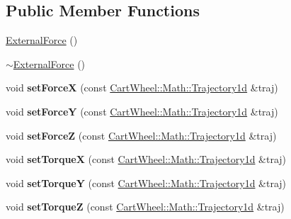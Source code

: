 \subsection*{Public Member Functions}
\begin{DoxyCompactItemize}
\item 
\hyperlink{classCartWheel_1_1Core_1_1ExternalForce_adad77fb363ad116e25f437e50814a629}{ExternalForce} ()
\item 
\hyperlink{classCartWheel_1_1Core_1_1ExternalForce_aebf14a4be55915ed564429a359a2b9d1}{$\sim$ExternalForce} ()
\item 
\hypertarget{classCartWheel_1_1Core_1_1ExternalForce_a99c1301919cb54b2657816791297f555}{
void {\bfseries setForceX} (const \hyperlink{classCartWheel_1_1Math_1_1GenericTrajectory}{CartWheel::Math::Trajectory1d} \&traj)}
\label{classCartWheel_1_1Core_1_1ExternalForce_a99c1301919cb54b2657816791297f555}

\item 
\hypertarget{classCartWheel_1_1Core_1_1ExternalForce_a2558648ac0b4e4d222b98fbcd281674e}{
void {\bfseries setForceY} (const \hyperlink{classCartWheel_1_1Math_1_1GenericTrajectory}{CartWheel::Math::Trajectory1d} \&traj)}
\label{classCartWheel_1_1Core_1_1ExternalForce_a2558648ac0b4e4d222b98fbcd281674e}

\item 
\hypertarget{classCartWheel_1_1Core_1_1ExternalForce_adda2adf4f4272bff96ed3fcf459e8988}{
void {\bfseries setForceZ} (const \hyperlink{classCartWheel_1_1Math_1_1GenericTrajectory}{CartWheel::Math::Trajectory1d} \&traj)}
\label{classCartWheel_1_1Core_1_1ExternalForce_adda2adf4f4272bff96ed3fcf459e8988}

\item 
\hypertarget{classCartWheel_1_1Core_1_1ExternalForce_ae3074310506da661e058107459a85071}{
void {\bfseries setTorqueX} (const \hyperlink{classCartWheel_1_1Math_1_1GenericTrajectory}{CartWheel::Math::Trajectory1d} \&traj)}
\label{classCartWheel_1_1Core_1_1ExternalForce_ae3074310506da661e058107459a85071}

\item 
\hypertarget{classCartWheel_1_1Core_1_1ExternalForce_a4eb9b339a567a96077987f4745534ff0}{
void {\bfseries setTorqueY} (const \hyperlink{classCartWheel_1_1Math_1_1GenericTrajectory}{CartWheel::Math::Trajectory1d} \&traj)}
\label{classCartWheel_1_1Core_1_1ExternalForce_a4eb9b339a567a96077987f4745534ff0}

\item 
\hypertarget{classCartWheel_1_1Core_1_1ExternalForce_ae799d3120311a28033002de2785b2920}{
void {\bfseries setTorqueZ} (const \hyperlink{classCartWheel_1_1Math_1_1GenericTrajectory}{CartWheel::Math::Trajectory1d} \&traj)}
\label{classCartWheel_1_1Core_1_1ExternalForce_ae799d3120311a28033002de2785b2920}


\end{DoxyCompactItemize}
